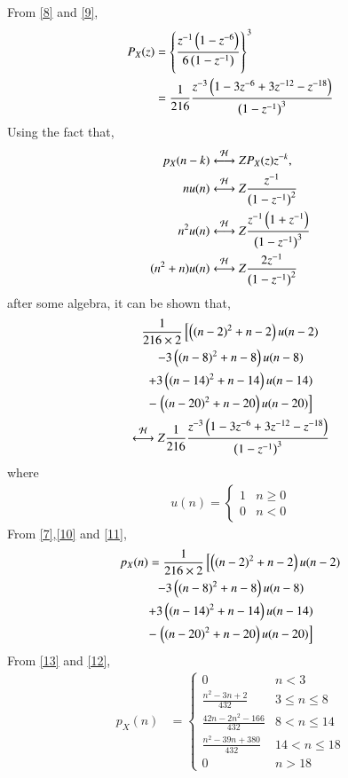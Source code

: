 \documentclass[journal,12pt,twocolumn]{IEEEtran}
\begin{document}
From \eqref{8} and \eqref{9},
\begin{align}
    P_X{\left(z\right)}&=\left\{\frac{z^{-1}\left(1-z^{-6}\right)}{6\left(1-z^{-1}\right)}\right\}^3\\
    &= \frac{1}{216}\frac{z^{-3}\left(1-3z^{-6}+3z^{-12}-z^{-18}\right)}{\left(1-z^{-1}\right)^3}\label{10}
\end{align}
Using the fact that,
\begin{align}
p_X(n-k) &\overset{\mathcal{H}}{ \longleftrightarrow}{Z}P_X(z)z^{-k},
\\
nu(n)&\overset{\mathcal{H}}{ \longleftrightarrow}{Z} \frac{z^{-1}}{\left(1-z^{-1}\right)^2}\\
n^2u(n)&\overset{\mathcal{H}}{ \longleftrightarrow}{Z} \frac{z^{-1}\left(1+z^{-1}\right)}{\left(1-z^{-1}\right)^3}\\
(n^2+n)u(n)&\overset{\mathcal{H}}{ \longleftrightarrow}{Z} \frac{2z^{-1}}{\left(1-z^{-1}\right)^2}
\end{align}
after some algebra, it can be shown that,
\begin{multline}
\frac{1}{216\times 2}{}\left[\left((n-2)^2+n-2\right)u(n-2)\right. \\-3 \left((n-8)^2+n-8\right)u(n-8)\\+3\left((n-14)^2+n-14\right)u(n-14)\\-{}\left.\left((n-20)^2+n-20\right)u(n-20)\right]
\\
\overset{\mathcal{H}}{ \longleftrightarrow}{Z}
\frac{1}{216}\frac{z^{-3}\left(1-3z^{-6}+3z^{-12}-z^{-18}\right)}{\left(1-z^{-1}\right)^3}
\label{11}
\end{multline}
where 
\begin{align}
u(n) =
\begin{cases}
1 & n \ge 0
\\
0 & n < 0\label{13}
\end{cases}
\end{align}
From \eqref{7},\eqref{10} and \eqref{11},
\begin{multline}
p_{X}(n) = \frac{1}{216\times 2}{}\left[\left((n-2)^2+n-2\right)u(n-2)\right. \\-3 \left((n-8)^2+n-8\right)u(n-8)\\+3\left((n-14)^2+n-14\right)u(n-14)\\-{}\left.\left((n-20)^2+n-20\right)u(n-20)\right]
\label{12}
\end{multline}
From \eqref{13} and \eqref{12},
\begin{align}
p_X(n) &= 
\begin{cases}
0 & n < 3\\
\frac{n^2-3n+2}{432} &  3 \le n \le  8\\
\frac{42n-2n^2-166}{432} & 8 < n \le 14\\
\frac{n^2-39n+380}{432} & 14 < n \le 18\\
0 & n > 18\label{14}
\end{cases}
\end{align}
\end{document}
